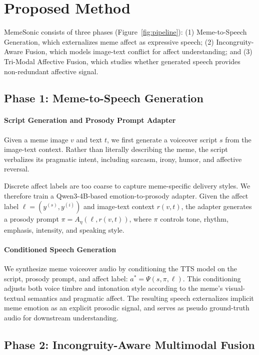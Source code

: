 \section{Proposed Method}

MemeSonic consists of three phases (Figure~\ref{fig:pipeline}): 
(1) Meme-to-Speech Generation, which externalizes meme affect as expressive speech; 
(2) Incongruity-Aware Fusion, which models image-text conflict for affect understanding; and 
(3) Tri-Modal Affective Fusion, which studies whether generated speech provides non-redundant affective signal.

\subsection{Phase 1: Meme-to-Speech Generation}

\paragraph{Script Generation and Prosody Prompt Adapter}
Given a meme image $v$ and text $t$, we first generate a voiceover script $s$ from the image-text context. Rather than literally describing the meme, the script verbalizes its pragmatic intent, including sarcasm, irony, humor, and affective reversal.

Discrete affect labels are too coarse to capture meme-specific delivery styles. We therefore train a Qwen3-4B-based emotion-to-prosody adapter. Given the affect label $\ell=(y^{(s)},y^{(i)})$ and image-text context $r(v,t)$, the adapter generates a prosody prompt $\pi=A_{\eta}(\ell,r(v,t))$, where $\pi$ controls tone, rhythm, emphasis, intensity, and speaking style.

\paragraph{Conditioned Speech Generation}
We synthesize meme voiceover audio by conditioning the TTS model on the script, prosody prompt, and affect label:
$a^{*}=\Psi(s,\pi,\ell)$.
This conditioning adjusts both voice timbre and intonation style according to the meme's visual-textual semantics and pragmatic affect. The resulting speech externalizes implicit meme emotion as an explicit prosodic signal, and serves as pseudo ground-truth audio for downstream understanding.

\subsection{Phase 2: Incongruity-Aware Multimodal Fusion}

